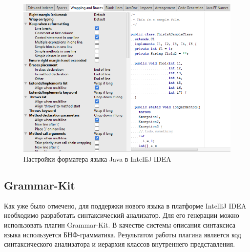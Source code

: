 \begin{figure}[t]
    \centering
    \includegraphics[width=.7\textwidth]{images/settingsjava.PNG}
    \caption{Настройки форматера языка Java в IntelliJ IDEA}
    \label{ov:settings}
\end{figure}

\subsection{Grammar-Kit}
Как уже было отмечено, для поддержки нового языка в платформе IntelliJ IDEA необходимо разработать синтаксический анализатор.
Для его генерации можно использовать плагин Grammar-Kit.
В качестве системы описания синтаксиса языка используется БНФ-грамматика.
Результатом работы плагина является код синтаксического анализатора и иерархия классов внутреннего представления. %

